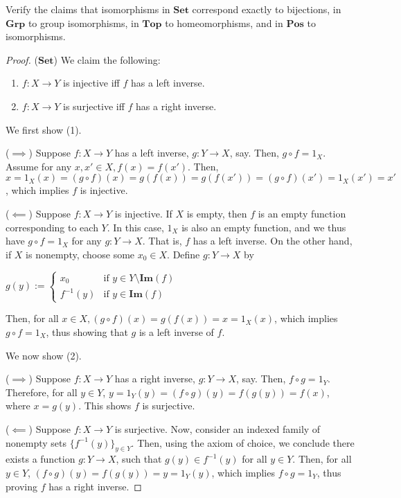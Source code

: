 \documentclass[]{amsbook}
\newcommand{\catname}[1]{\mathbf{#1}}
\begin{document}
\begin{Exercise}
	Verify the claims that isomorphisms in $\catname{Set}$ correspond exactly
	to bijections, in $\catname{Grp}$ to group isomorphisms, in $\catname{Top}$
	to homeomorphisms, and in $\catname{Pos}$ to isomorphisms.
\end{Exercise}
\begin{proof}
    ($\catname{Set}$) We claim the following:
    \begin{enumerate}
        \item $f: X \to Y$ is injective iff $f$ has a left inverse.
        \item $f: X \to Y$ is surjective iff $f$ has a right inverse.
    \end{enumerate}
    We first show (1).

    ($\implies$) Suppose $f: X \to Y$ has a left inverse, $g: Y \to X$, say.
    Then, $g \circ f = 1_X$. Assume for any $x, x' \in X, f(x) = f(x')$. Then,
    $x = 1_X(x) = (g \circ f)(x) = g(f(x)) = g(f(x')) = (g \circ f)(x') =
    1_X(x') = x'$, which implies $f$ is injective.

    ($\impliedby$) Suppose $f: X \to Y$ is injective. If $X$ is empty, then $f$
    is an empty function corresponding to each $Y$. In this case, $1_X$ is also
    an empty function, and we thus have $g \circ f = 1_X$ for any $g: Y \to X$.
    That is, $f$ has a left inverse. On the other hand, if $X$ is nonempty,
    choose some $x_0 \in X$. Define $g: Y \to X$ by
    \begin{center}
        $g(y) :=
        \begin{cases}
        x_0 & \text{if } y \in Y \setminus \mathbf{Im}(f) \\
        f^{-1}(y) & \text{if } y \in \mathbf{Im}(f)
        \end{cases}$
    \end{center}
    Then, for all $x \in X, (g \circ f)(x) = g(f(x)) = x = 1_X(x)$, which
    implies $g \circ f = 1_X$, thus showing that $g$ is a left inverse of $f$.

    We now show (2).

    ($\implies$) Suppose $f: X \to Y$ has a right inverse, $g: Y \to X$, say.
    Then, $f \circ g = 1_Y$. Therefore, for all $y \in Y$, $y = 1_Y(y) =
    (f \circ g)(y) = f(g(y)) = f(x)$, where $x = g(y)$. This shows $f$ is
    surjective.

    ($\impliedby$) Suppose $f: X \to Y$ is surjective. Now, consider an indexed
    family of nonempty sets $\{ f^{-1}(y)\}_{y \in Y}$. Then, using the axiom
    of choice, we conclude there exists a function $g: Y \to X$, such that $g(y)
    \in f^{-1}(y)$ for all $y \in Y$. Then, for all $y \in Y$, $(f \circ g)(y) =
    f(g(y)) = y = 1_Y(y)$, which implies $f \circ g = 1_Y$, thus proving $f$ has
    a right inverse.


\end{proof}
\end{document}
